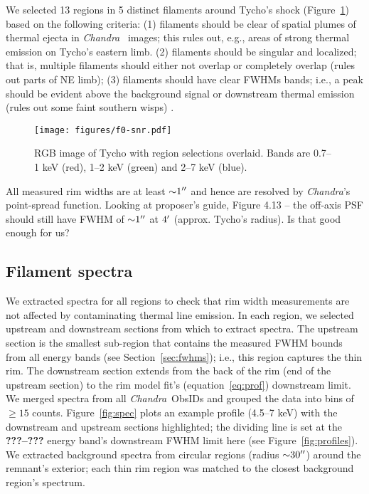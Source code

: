 \documentclass[iop, apj, numberedappendix, twocolappendix]{emulateapj}
\newcommand*{\abt}{\mathord{\sim}} %
\newcommand*{\Chandra}{\textit{Chandra}\ }
\begin{document}
We selected 13 regions in 5 distinct filaments around Tycho's shock
(Figure~\ref{fig:snr}) based on the following criteria:
(1) filaments should be clear of spatial plumes of thermal ejecta in \Chandra
images; this rules out, e.g., areas of strong thermal emission on Tycho's eastern limb.
(2) filaments should be singular and localized; that is, multiple filaments
should either not overlap or completely overlap (rules out parts of NE limb);
(3) filaments should have clear FWHMs bands; i.e., a peak should be evident
above the background signal or downstream thermal emission (rules out some
faint southern wisps) .

\begin{figure}
    \centering
    \texttt{[image: figures/f0-snr.pdf]}
    \caption{RGB image of Tycho with region selections overlaid.  Bands are
    0.7--1 keV (red), 1--2 keV (green) and 2--7 keV (blue).
    }
    \label{fig:snr}
\end{figure}

All measured rim widths are at least $\abt 1\arcsec$ and hence are resolved by
\textit{Chandra}'s point-spread function.
Looking at proposer's guide, Figure 4.13 -- the off-axis PSF should
still have FWHM of $\abt 1\arcsec$ at $4\mbox{$^\prime$}$ (approx. Tycho's radius).
Is that good enough for us?

\subsection{Filament spectra}
\label{sec:spec}

We extracted spectra for all regions to check that rim width measurements are
not affected by contaminating thermal line emission.  In each region, we
selected upstream and downstream sections from which to extract spectra.  The
upstream section is the smallest sub-region that contains the measured FWHM
bounds from all energy bands (see Section~\ref{sec:fwhms}); i.e., this region
captures the thin rim.  The downstream section extends from the back of the rim
(end of the upstream section) to the rim model fit's (equation~\eqref{eq:prof})
downstream limit.  We merged spectra from all \Chandra ObsIDs and grouped the
data into bins of $\geq 15$ counts.  Figure~\ref{fig:spec} plots an example
profile (4.5--7 keV) with the downstream and upstream sections highlighted; the
dividing line is set at the \textbf{???--???} energy band's downstream FWHM
limit here (see Figure~\ref{fig:profiles}).
We extracted background spectra from circular regions (radius $\abt 30\arcsec$)
around the remnant's exterior; each thin rim region was matched to the closest
background region's spectrum.
\end{document}
